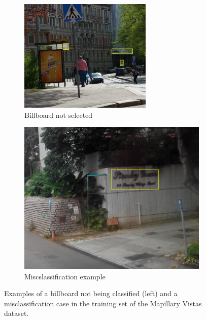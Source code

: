 \begin{figure}[H]
    \centering
    \begin{subfigure}[b]{0.45\textwidth}
        \centering
        \includegraphics[width=\textwidth]{src/images/mis1.png}
        \caption{Billboard not selected}
        \label{fig:image1}
    \end{subfigure}
    \hfill
    \begin{subfigure}[b]{0.45\textwidth}
        \centering
        \includegraphics[width=\textwidth]{src/images/mis2.png}
        \caption{Miscslassification example}
        \label{fig:image2}
    \end{subfigure}
    \caption{Examples of a billboard not being classified (left) and a misclassification case in the training set of the Mapillary Vistas dataset.}
    \label{fig:comparison}
\end{figure}


